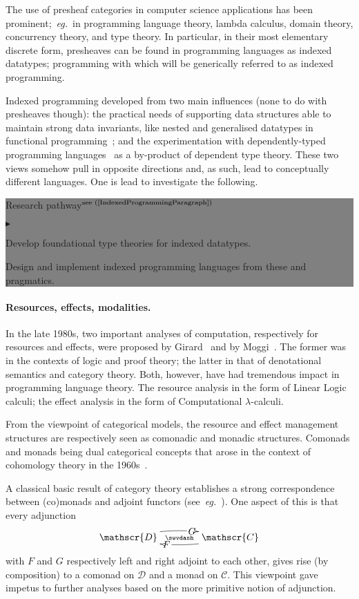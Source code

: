 \documentclass[11pt,twocolumn]{article}
\newenvironment{btritemize}
  {\begin{list}{\btr}
  {\setlength{\topsep}{2pt}
   \setlength{\partopsep}{2pt}
   \setlength{\itemsep}{2.5pt}
   \setlength{\parsep}{2.5pt}
   \setlength{\leftmargin}{1em}
   \setlength{\labelwidth}{.5em}}}
  {\end{list}}
\newcommand{\mytextsf}[1]{\textsf{\small #1}}
\newcommand{\eg}{\emph{eg.}}
\newcommand{\btr}{$\blacktriangleright$}
\newcommand{\reqpsize}{8.113395cm}%
\newcommand{\rep}[2]{\begin{center}\colorbox{grey}{\begin{minipage}{\reqpsize}
  \mytextsf{Research pathway}\hfill$^{\mbox{\scriptsize see #1 }}$\\[-5.5mm]
  \begin{btritemize}
  \item #2
  \end{btritemize}
\end{minipage}}\end{center}}
\newcommand{\cat}[1]{\mathscr{#1}}
\begin{document}
The use of presheaf categories in computer science applications has been
prominent;~\eg~in 
programming language theory, %
lambda calculus, %
domain theory, %
concurrency theory, %
and type theory. %
In particular, in their most elementary discrete form, presheaves can be
found in programming languages as indexed datatypes; programming with
which will be generically referred to as indexed programming.  

Indexed programming developed from two main influences (none to do with
presheaves though): the practical needs of supporting data structures able to
maintain strong data invariants, like nested %
and generalised %
datatypes in functional programming~\cite{Omega,Haskell}; and the
experimentation with dependently-typed programming
languages~\cite{Cayenne,Epigram} as a by-product of dependent type theory.
These two views somehow pull in opposite directions and, as such, lead to
conceptually different languages.  One is lead to investigate the following.
\rep{(\ref{IndexedProgrammingParagraph})} 
  {Develop foundational type theories for indexed datatypes.  
    
   Design and %
   implement indexed programming languages from these and
   pragmatics.}

\paragraph{Resources, effects, modalities.}
\label{ResourcesEffectsModalitiesParagraph}

In the late 1980s, two important analyses of computation, respectively for
resources and effects, were proposed by Girard~\cite{GirardLinearLogic} and by
Moggi~\cite{MoggiLambdaC}.  The former was in the contexts of logic and proof
theory; the latter in that of denotational semantics and category theory.
Both, however, have had tremendous impact in programming language theory.  The
resource analysis in the form of Linear Logic calculi; the effect analysis
in the form of Computational \mbox{$\lambda$-calculi}.

From the viewpoint of categorical models, the resource and effect management
structures are respectively seen as comonadic and monadic structures.
Comonads and monads being dual categorical concepts that arose in the context
of cohomology theory in the 1960s~\cite{BeckThesis}.

A classical basic result of category theory establishes a strong
correspondence between (co)monads and adjoint functors
(see~\eg~\cite{MacLane}).  One aspect of this is that every adjunction
\begin{equation}\label{ResourceEffectAdjunction}
  \xymatrix@C=40pt{
    \cat D \ar@/^.75em/[r]|(.625){\mbox{$\,G\,$}}\ar@{}[r]|-\swvdash&
    \ar@/^.75em/[l]|(.625){\mbox{$\,F\,$}} \cat C }
\end{equation}
with $F$ and $G$ respectively left and right adjoint to each other, gives
rise (by composition) to a comonad on $\cat D$ and a monad on $\cat C$.  This
viewpoint gave impetus to further analyses based on the more primitive notion
of adjunction.  
\end{document}
